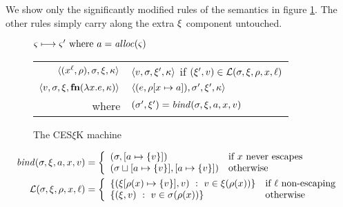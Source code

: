 \documentclass{llncs}
\begin{document}
We show only the significantly modified rules of the semantics in
figure \ref{fig:frame-semantics}. The other rules simply carry along
the extra $\mframe$ component untouched.
\begin{figure}
  \centering
  $\mstate \stepto \mstate' \text{ where } \maddr = \alloc(\mstate)$ \\
  \begin{tabular}{r|l}
    \hline
    $\tpl{(\svar[\mlab]{\mvar}, \menv), \mstore, \mframe, \mkont}$
    &
    $\tpl{\mval,\mstore,\mframe',\mkont}$ if $(\mframe', \mval) \in \lookup(\mstore,\mframe,\menv,\mvar,\mlab)$
    \\
    $\tpl{\mval,\mstore,\mframe,\kfn{\slam{\mvar}{\mexpr}, \mkont}}$
    &
    $\tpl{(\mexpr, \extm{\menv}{\mvar}{\maddr}), \mstore', \mframe', \mkont}$
    \\ where & $(\mstore',\mframe') = \bind(\mstore,\mframe,\maddr,\mvar,\mval)$
  \end{tabular}
  \caption{The CES$\xi$K machine}
  \label{fig:frame-semantics}
\end{figure}

\begin{align*}
  \bind(\mstore,\mframe,\maddr,\mvar,\mval) &=
   \left\{\begin{array}{ll}
            (\mstore, \snglm{\maddr}{\mval}) & \text{if } \mvar \text{ never escapes} \\
            (\joinone{\mstore}{\maddr}{\mval}, \snglm{\maddr}{\mval}) & \text{otherwise } \\
          \end{array}\right. \\
  \lookup(\mstore,\mframe,\menv,\mvar,\mlab) &=
    \left\{\begin{array}{ll}
          \setbuild{(\extm{\mframe}{\menv(\mvar)}{\set{\mval}}, \mval)}
                   {\mval \in \mframe(\menv(\mvar))}
                   & \text{if } \mlab \text{ non-escaping} \\
          \setbuild{(\mframe,\mval)}{\mval \in \mstore(\menv(\mvar))} & \text{otherwise}
           \end{array}\right.
\end{align*}
\end{document}
